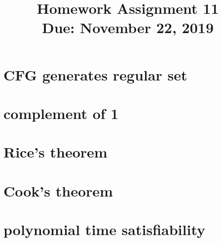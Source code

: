 \documentclass[11pt,letterpaper]{article}
\title{Homework Assignment 11 \\
    \small Due: November 22, 2019}
\begin{document}
\maketitle

\section{CFG generates regular set}


\section{complement of 1}


\section{Rice's theorem}


\section{Cook's theorem}


\section{polynomial time satisfiability}
\end{document}
